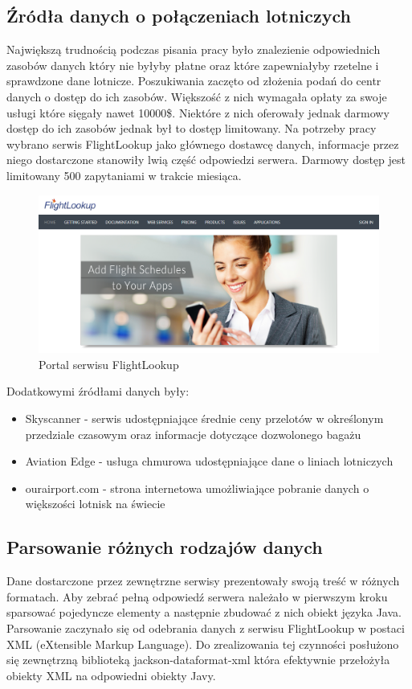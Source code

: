 \documentclass[a4paper, 12pt, twoside]{article}
\begin{document}
\subsection{Źródła danych o połączeniach lotniczych}
Największą trudnością podczas pisania pracy było znalezienie odpowiednich zasobów danych który nie byłyby płatne oraz które zapewniałyby rzetelne i sprawdzone dane lotnicze. Poszukiwania zaczęto od złożenia podań do centr danych o dostęp do ich zasobów. Większość z nich wymagała opłaty za swoje usługi które sięgały nawet 10000\$. Niektóre z nich oferowały jednak darmowy dostęp do ich zasobów jednak był to dostęp limitowany. Na potrzeby pracy wybrano serwis FlightLookup jako głównego dostawcę danych, informacje przez niego dostarczone stanowiły lwią część odpowiedzi serwera. Darmowy dostęp jest limitowany 500 zapytaniami w trakcie miesiąca.
\vspace{1.0cm}
\begin{figure}[!ht]
\centering
\includegraphics[scale=0.4, keepaspectratio]{flightlookup.png}
\caption{Portal serwisu FlightLookup}
\label{fig:flightlookup}
\end{figure}
\newpage
Dodatkowymi źródłami danych były:
\begin{itemize}[noitemsep,topsep=0pt]
\item Skyscanner - serwis udostępniające średnie ceny przelotów w określonym przedziale czasowym oraz informacje dotyczące dozwolonego bagażu
\item Aviation Edge - usługa chmurowa udostępniające dane o liniach lotniczych 
\item ourairport.com - strona internetowa umożliwiające pobranie danych o większości lotnisk na świecie
\end{itemize}

\subsection{Parsowanie różnych rodzajów danych}
Dane dostarczone przez zewnętrzne serwisy prezentowały swoją treść w różnych formatach. Aby zebrać pełną odpowiedź serwera należało w pierwszym kroku sparsować pojedyncze elementy a następnie zbudować z nich obiekt języka Java. Parsowanie zaczynało się od odebrania danych z serwisu FlightLookup w postaci XML (eXtensible Markup Language). Do zrealizowania tej czynności posłużono się zewnętrzną biblioteką jackson-dataformat-xml która efektywnie przełożyła obiekty XML na odpowiedni obiekty Javy.
\end{document}
